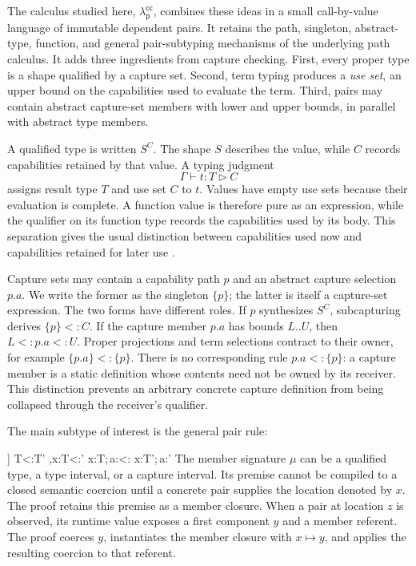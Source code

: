 \documentclass[acmsmall,screen,nonacm]{acmart}
\newcommand{\ruleuse}[1]{%
  \hyperref[rule:#1]{\textsc{#1}}}
\newcommand{\lambdapcc}{\ensuremath{\lambda_{\mathsf p}^{\mathsf{cc}}}}
\newcommand{\cset}[1]{\{#1\}}
\newcommand{\capt}[2]{#1^{#2}}
\newcommand{\pairshape}[4]{\langle #1\!:\!#2;\,#3\!:\!#4\rangle}
\newcommand{\uses}{\mathbin{\triangleright}}
\newcommand{\rulesetup}{%
  \small
  \smallrulenames
  \setlength{\afterruleskip}{1.45em plus 0.2em minus 0.1em}%
  \setlength{\labelminsep}{0.65em}%
  \renewcommand{\arraystretch}{1.15}%
  \renewcommand{\andalso}{\qquad}%
}
\begin{document}
The calculus studied here, \lambdapcc{}, combines these ideas in a small
call-by-value language of immutable dependent pairs. It retains the path,
singleton, abstract-type, function, and general pair-subtyping mechanisms of
the underlying path calculus. It adds three ingredients from capture
checking. First, every proper type is a shape qualified by a capture set.
Second, term typing produces a \emph{use set}, an upper bound on the
capabilities used to evaluate the term. Third, pairs may contain abstract
capture-set members with lower and upper bounds, in parallel with abstract
type members.

A qualified type is written \(\capt{S}{C}\). The shape \(S\) describes the
value, while \(C\) records capabilities retained by that value. A typing
judgment
\[
  \Gamma\vdash t:T\uses C
\]
assigns result type \(T\) and use set \(C\) to \(t\). Values have empty use
sets because their evaluation is complete. A function value is therefore
pure as an expression, while the qualifier on its function type records the
capabilities used by its body. This separation gives the usual distinction
between capabilities used now and capabilities retained for later use
\citep{xu2025box,boruch2023capture}.

Capture sets may contain a capability path \(p\) and an abstract capture
selection \(p.a\). We write the former as the singleton \(\cset p\); the
latter is itself a capture-set expression. The two forms have different
roles. If \(p\) synthesizes \(\capt{S}{C}\), subcapturing derives
\(\cset p<:C\). If the capture member \(p.a\) has bounds \(L..U\), then
\(L<:p.a<:U\). Proper projections and term selections contract to their
owner, for example \(\cset{p.a}<:\cset p\). There is no corresponding rule
\(p.a<:\cset p\): a capture member is a static definition whose contents
need not be owned by its receiver. This distinction prevents an arbitrary
concrete capture definition from being collapsed through the receiver's
qualifier.

The main subtype of interest is the general pair rule:
\begingroup
\rulesetup
\infrule[\ruleuse{ss-pair}]
  {\Gamma\vdash T<:T'
   \andalso
   \Gamma,x:T\vdash\mu<:\mu'}
  {\Gamma\vdash
    \pairshape{x}{T}{a}{\mu}<:
    \pairshape{x}{T'}{a}{\mu'}}
\endgroup
The member signature \(\mu\) can be a qualified type, a type interval, or a
capture interval. Its premise cannot be compiled to a closed semantic
coercion until a concrete pair supplies the location denoted by \(x\).
The proof retains this premise as a member closure. When a pair at location
\(z\) is observed, its runtime value exposes a first component \(y\) and a
member referent. The proof coerces \(y\), instantiates the member closure with
\(x\mapsto y\), and applies the resulting coercion to that referent.
\end{document}
